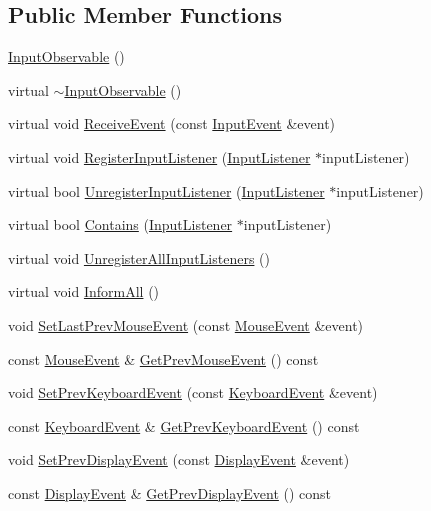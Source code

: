 \subsection*{Public Member Functions}
\begin{DoxyCompactItemize}
\item 
\mbox{\hyperlink{classec_1_1_input_observable_a92422814189d1210f631f4d1378877f3}{Input\+Observable}} ()
\item 
virtual \mbox{\hyperlink{classec_1_1_input_observable_ac261f6a73cfdcd37c276e732cc25f869}{$\sim$\+Input\+Observable}} ()
\item 
virtual void \mbox{\hyperlink{classec_1_1_input_observable_aa043e1a78987c55e03acca7caf13820f}{Receive\+Event}} (const \mbox{\hyperlink{structec_1_1_input_event}{Input\+Event}} \&event)
\item 
virtual void \mbox{\hyperlink{classec_1_1_input_observable_a64505667464dde9b0e031fefe2468c43}{Register\+Input\+Listener}} (\mbox{\hyperlink{classec_1_1_input_listener}{Input\+Listener}} $\ast$input\+Listener)
\item 
virtual bool \mbox{\hyperlink{classec_1_1_input_observable_a06647b619d83edc42f33b23b4db80127}{Unregister\+Input\+Listener}} (\mbox{\hyperlink{classec_1_1_input_listener}{Input\+Listener}} $\ast$input\+Listener)
\item 
virtual bool \mbox{\hyperlink{classec_1_1_input_observable_a7431f35b81b1a34f40605b10739e3ac1}{Contains}} (\mbox{\hyperlink{classec_1_1_input_listener}{Input\+Listener}} $\ast$input\+Listener)
\item 
virtual void \mbox{\hyperlink{classec_1_1_input_observable_a65608ab3e937537a9058acfa9b7e9fde}{Unregister\+All\+Input\+Listeners}} ()
\item 
virtual void \mbox{\hyperlink{classec_1_1_input_observable_a2c3af1f58103d41e21bd95fed9131c5b}{Inform\+All}} ()
\item 
void \mbox{\hyperlink{classec_1_1_input_observable_a317a5d73fe50080167524b729ecf4996}{Set\+Last\+Prev\+Mouse\+Event}} (const \mbox{\hyperlink{structec_1_1_mouse_event}{Mouse\+Event}} \&event)
\item 
const \mbox{\hyperlink{structec_1_1_mouse_event}{Mouse\+Event}} \& \mbox{\hyperlink{classec_1_1_input_observable_a6eb1660661290184fc1fe522f6b6651e}{Get\+Prev\+Mouse\+Event}} () const
\item 
void \mbox{\hyperlink{classec_1_1_input_observable_a7a45c985f2d778f6dfcd4708d6261395}{Set\+Prev\+Keyboard\+Event}} (const \mbox{\hyperlink{structec_1_1_keyboard_event}{Keyboard\+Event}} \&event)
\item 
const \mbox{\hyperlink{structec_1_1_keyboard_event}{Keyboard\+Event}} \& \mbox{\hyperlink{classec_1_1_input_observable_a25274eaa64334ec3d0c00dfb55f794c2}{Get\+Prev\+Keyboard\+Event}} () const
\item 
void \mbox{\hyperlink{classec_1_1_input_observable_ad4774821c9e54a31409b575b54639326}{Set\+Prev\+Display\+Event}} (const \mbox{\hyperlink{structec_1_1_display_event}{Display\+Event}} \&event)
\item 
const \mbox{\hyperlink{structec_1_1_display_event}{Display\+Event}} \& \mbox{\hyperlink{classec_1_1_input_observable_af18dbc3d7fe632683176b751d901f5d3}{Get\+Prev\+Display\+Event}} () const
\end{DoxyCompactItemize}
